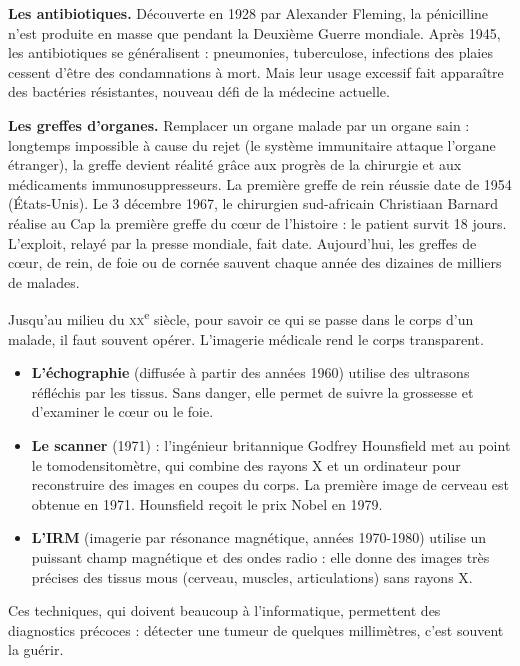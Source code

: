 \documentclass[11pt]{article}
\newcommand{\cle}[1]{{\popxbold\color{popdark}#1}}
\newcounter{popsec}
\newcounter{popsub}
\newcommand{\courssub}[1]{%
  \stepcounter{popsub}%
  \par\vspace{9pt}\noindent{\popxbold\fontsize{11.5}{13}\selectfont\color{popink}{\color{poporange}\thepopsec.\thepopsub}\hspace{6pt}#1}\par\nopagebreak\vspace{4pt}
}
\begin{document}
\textbf{Les antibiotiques.} Découverte en 1928 par Alexander Fleming, la \cle{pénicilline} n'est produite en masse que pendant la Deuxième Guerre mondiale. Après 1945, les antibiotiques se \cle{généralisent} : pneumonies, tuberculose, infections des plaies cessent d'être des condamnations à mort. Mais leur usage excessif fait apparaître des bactéries \cle{résistantes}, nouveau défi de la médecine actuelle.

\textbf{Les greffes d'organes.} Remplacer un organe malade par un organe sain : longtemps impossible à cause du \cle{rejet} (le système immunitaire attaque l'organe étranger), la greffe devient réalité grâce aux progrès de la chirurgie et aux médicaments \cle{immunosuppresseurs}. La première greffe de rein réussie date de 1954 (États-Unis). Le 3 décembre 1967, le chirurgien sud-africain Christiaan \cle{Barnard} réalise au Cap la première \cle{greffe du cœur} de l'histoire : le patient survit 18 jours. L'exploit, relayé par la presse mondiale, fait date. Aujourd'hui, les greffes de cœur, de rein, de foie ou de cornée sauvent chaque année des dizaines de milliers de malades.

\courssub{L'imagerie médicale : voir sans ouvrir}

Jusqu'au milieu du \textsc{xx}\textsuperscript{e} siècle, pour savoir ce qui se passe dans le corps d'un malade, il faut souvent opérer. L'\cle{imagerie médicale} rend le corps transparent.

\begin{itemize}
\item \textbf{L'échographie} (diffusée à partir des années 1960) utilise des \cle{ultrasons} réfléchis par les tissus. Sans danger, elle permet de suivre la grossesse et d'examiner le cœur ou le foie.
\item \textbf{Le scanner} (1971) : l'ingénieur britannique Godfrey \cle{Hounsfield} met au point le \cle{tomodensitomètre}, qui combine des rayons X et un ordinateur pour reconstruire des images en coupes du corps. La première image de cerveau est obtenue en 1971. Hounsfield reçoit le prix Nobel en 1979.
\item \textbf{L'IRM} (imagerie par résonance magnétique, années 1970-1980) utilise un puissant champ magnétique et des ondes radio : elle donne des images très précises des tissus mous (cerveau, muscles, articulations) sans rayons X.
\end{itemize}

Ces techniques, qui doivent beaucoup à l'informatique, permettent des \cle{diagnostics précoces} : détecter une tumeur de quelques millimètres, c'est souvent la guérir.
\end{document}
